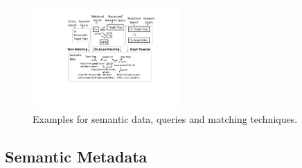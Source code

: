 \begin{figure}[thb]
	\centering
		\includegraphics[width=0.5\textwidth]{figs/matching}
	\caption{Examples for semantic data, queries and matching techniques.}
	\label{fig:matching}
	\vspace{-0.5cm}
\end{figure}


	
\subsection{Semantic Metadata}


